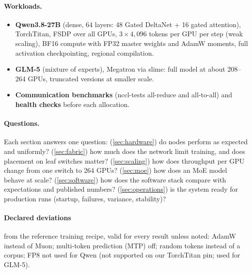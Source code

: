 \paragraph{Workloads.}
\begin{itemize}[leftmargin=*, itemsep=1pt]
  \item \textbf{Qwen3.8-27B} (dense, 64 layers: 48 Gated DeltaNet + 16 gated attention), TorchTitan,
        FSDP over all GPUs, $3 \times 4{,}096$ tokens per GPU per step (weak scaling), BF16 compute with
        FP32 master weights and AdamW moments, full activation checkpointing, regional compilation.
  \item \textbf{GLM-5} (mixture of experts), Megatron via slime: full model at about 208--264 GPUs,
        truncated versions at smaller scale. 
  \item \textbf{Communication benchmarks} (nccl-tests all-reduce and all-to-all) and \textbf{health
        checks} before each allocation.
\end{itemize}

\paragraph{Questions.} Each section answers one question:
(\cref{sec:hardware}) do nodes perform as expected and uniformly?
(\cref{sec:fabric}) how much does the network limit training, and does placement on leaf switches matter?
(\cref{sec:scaling}) how does throughput per GPU change from one switch to 264 GPUs?
(\cref{sec:moe}) how does an MoE model behave at scale?
(\cref{sec:software}) how does the software stack compare with expectations and published numbers?
(\cref{sec:operations}) is the system ready for production runs (startup, failures, variance, stability)?

\paragraph{Declared deviations} from the reference training recipe, valid for every result unless noted:
AdamW instead of Muon; multi-token prediction (MTP) off; random tokens instead of a corpus; FP8 not
used for Qwen (not supported on our TorchTitan pin; used for GLM-5).
